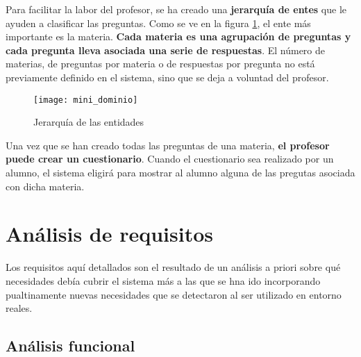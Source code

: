 Para facilitar la labor del profesor, se ha creado una \textbf{jerarquía de entes} que le ayuden a clasificar las preguntas. Como se ve en la figura \ref{fig:mini dominio}, el ente más importante es la materia. \textbf{Cada materia es una agrupación de preguntas y cada pregunta lleva asociada una serie de respuestas}. El número de materias, de preguntas por materia o de respuestas por pregunta no está previamente definido en el sistema, sino que se deja a voluntad del profesor.

\begin{figure}[htp!]
	\centering
	\texttt{[image: mini\_dominio]}
	\caption{Jerarquía de las entidades}
	\label{fig:mini dominio}
\end{figure}

Una vez que se han creado todas las preguntas de una materia, \textbf{el profesor puede crear un cuestionario}. Cuando el cuestionario sea realizado por un alumno, el sistema eligirá para mostrar al alumno alguna de las pregutas asociada con dicha materia.




\section{Análisis de requisitos}

Los requisitos aquí detallados son el resultado de un análisis a priori sobre qué necesidades debía cubrir el sistema más a las que se hna ido incorporando pualtinamente nuevas necesidades que se detectaron al ser utilizado en entorno reales. %

\subsection{Análisis funcional}

